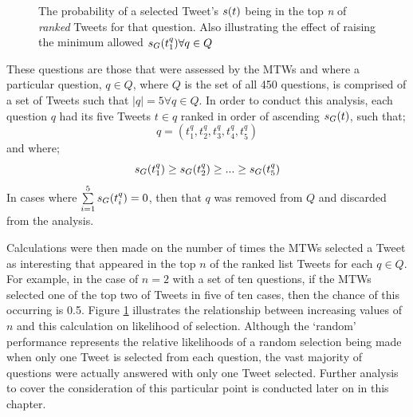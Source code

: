 \begin{figure}[h]
\centering
{}
\caption{The probability of a selected Tweet's $s(t)$ being in the top \textit{n} of \textit{ranked} Tweets for that question. Also illustrating the effect of raising the minimum allowed $s_G(t^q_1) \forall q \in Q$}
\label{fig:score-dist}
\end{figure}

These questions are those that were assessed by the MTWs and where a particular question, $q \in Q$, where $Q$ is the set of all 450 questions, is comprised of a set of Tweets such that $|q| = 5 \forall q \in Q$. In order to conduct this analysis, each question $q$ had its five Tweets $t \in q$ ranked in order of ascending $s_G(t)$, such that;
\[
    q = (t^q_1, t^q_2, t^q_3, t^q_4, t^q_5)
\]
and where; 
\[
    s_G(t^q_1) \geq s_G(t^q_2) \geq ... \geq s_G(t^q_5)
\]
In cases where $\sum\limits_{i=1}^5 s_G(t^q_i) = 0$, then that $q$ was removed from $Q$ and discarded from the analysis.

Calculations were then made on the number of times the MTWs selected a Tweet as interesting that appeared in the top $n$ of the ranked list Tweets for each $q \in Q$. For example, in the case of $n=2$ with a set of ten questions, if the MTWs selected one of the top two of Tweets in five of ten cases, then the chance of this occurring is 0.5. Figure \ref{fig:score-dist} illustrates the relationship between increasing values of $n$ and this calculation on likelihood of selection. Although the `random' performance represents the relative likelihoods of a random selection being made when only one Tweet is selected from each question, the vast majority of questions were actually answered with only one Tweet selected. Further analysis to cover the consideration of this particular point is conducted later on in this chapter.


